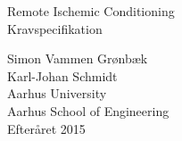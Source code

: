 \thispagestyle{empty} %


\colorbox{usDef}{
	\parbox[t]{1.0\linewidth}{
		\centering \fontsize{30pt}{50pt}\selectfont %
		\vspace*{0.7cm} %
		
		\hfill Remote Ischemic Conditioning\\
		\hfill Kravspecifikation \\
		
		\vspace*{0.7cm} %
	}
}

\vfill %


{\centering \large 
	\hfill Simon Vammen Grønbæk \\
	\hfill Karl-Johan Schmidt\\
	\hfill Aarhus University \\
	\hfill Aarhus School of Engineering\\
	\hfill Efteråret 2015 \\
}

\clearpage %
